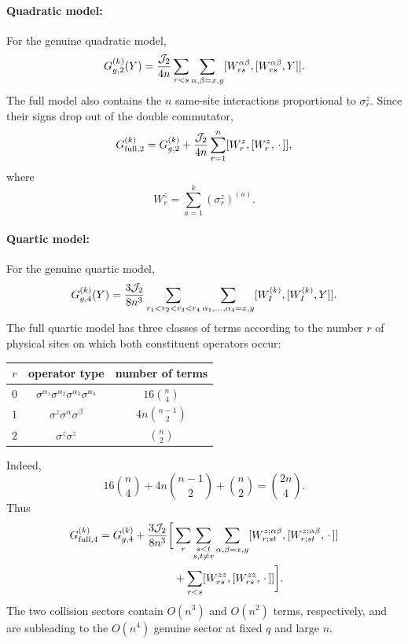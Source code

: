 \documentclass{article}
\theoremstyle{definition}
\begin{document}
\paragraph{Quadratic model:} For the genuine quadratic model,
\begin{equation}
    G_{g,2}^{(k)}(Y)
    =\frac{{\cal J}_2}{4n}
      \sum_{r<s}\sum_{\alpha,\beta=x,y}
      [W_{rs}^{\alpha\beta},[W_{rs}^{\alpha\beta},Y]].
\end{equation}
The full model also contains the $n$ same-site interactions proportional to
$\sigma_r^z$.  Since their signs drop out of the double commutator,
\begin{equation}
    G_{{\rm full},2}^{(k)}
    =G_{g,2}^{(k)}
     +\frac{{\cal J}_2}{4n}
      \sum_{r=1}^n[W_r^z,[W_r^z,\,\cdot\,]],
\end{equation}
where
\begin{equation}
    W_r^z=\sum_{a=1}^k(\sigma_r^z)^{(a)}.
\end{equation}

\paragraph{Quartic model:} For the genuine quartic model,
\begin{equation}
    G_{g,4}^{(k)}(Y)
    =\frac{3{\cal J}_2}{8n^3}
      \sum_{r_1<r_2<r_3<r_4}
      \sum_{\alpha_1,\ldots,\alpha_4=x,y}
      [W_I^{(k)},[W_I^{(k)},Y]].
\end{equation}
The full quartic model has three classes of terms according to the number
$r$ of physical sites on which both constituent operators occur:
\begin{center}
\begin{tabular}{c|c|c}
$r$ & operator type & number of terms \\
\hline
$0$ & $\sigma^{\alpha_1}\sigma^{\alpha_2}
       \sigma^{\alpha_3}\sigma^{\alpha_4}$
    & $16\binom n4$ \\
$1$ & $\sigma^z\sigma^\alpha\sigma^\beta$
    & $4n\binom{n-1}{2}$ \\
$2$ & $\sigma^z\sigma^z$
    & $\binom n2$
\end{tabular}
\end{center}
Indeed,
\begin{equation}
    16\binom n4+4n\binom{n-1}{2}+\binom n2=\binom{2n}{4}.
\end{equation}
Thus
\begin{align}
    G_{{\rm full},4}^{(k)}
    =G_{g,4}^{(k)}
    +\frac{3{\cal J}_2}{8n^3}
    \bigg[&
      \sum_r\sum_{\substack{s<t\\s,t\neq r}}
      \sum_{\alpha,\beta=x,y}
      [W_{r;st}^{z;\alpha\beta},
       [W_{r;st}^{z;\alpha\beta},\,\cdot\,]]
      \nonumber\\
      &+\sum_{r<s}[W_{rs}^{zz},[W_{rs}^{zz},\,\cdot\,]]
    \bigg].
\end{align}
The two collision sectors contain $O(n^3)$ and $O(n^2)$ terms,
respectively, and are subleading to the $O(n^4)$ genuine sector at fixed
$q$ and large $n$.
\end{document}
